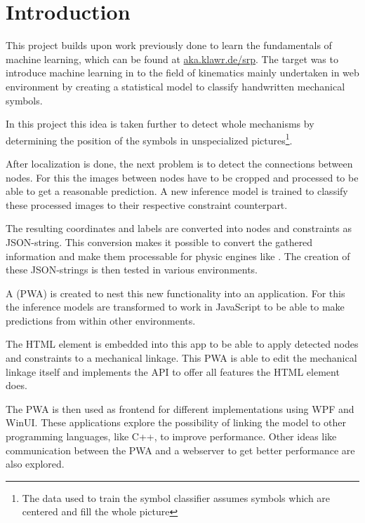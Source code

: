 
\section{Introduction}

This project builds upon work previously done to learn the fundamentals of machine learning, which can be found at \url{aka.klawr.de/srp}.
The target was to introduce machine learning in to the field of kinematics mainly undertaken in web environment by creating a statistical model to classify handwritten mechanical symbols.

In this project this idea is taken further to detect whole mechanisms by determining the position of the symbols in unspecialized pictures\footnote{The data used to train the symbol classifier assumes symbols which are centered and fill the whole picture}.

After localization is done, the next problem is to detect the connections between nodes.
For this the images between nodes have to be cropped and processed to be able to get a reasonable prediction.
A new inference model is trained to classify these processed images to their respective constraint counterpart.

The resulting coordinates and labels are converted into  nodes and constraints as JSON-string.
This conversion makes it possible to convert the gathered information and make them processable for physic engines like .
The creation of these JSON-strings is then tested in various environments.

A (PWA) is created to nest this new functionality into an application.
For this the inference models are transformed to work in JavaScript to be able to make predictions from within other environments.

The  HTML element is embedded into this app to be able to apply detected nodes and constraints to a mechanical linkage.
This PWA is able to edit the mechanical linkage itself and implements the  API to offer all features the  HTML element does.

The PWA is then used as frontend for different implementations using WPF and WinUI.
These applications explore the possibility of linking the model to other programming languages, like C++, to improve performance.
Other ideas like communication between the PWA and a webserver to get better performance are also explored.

